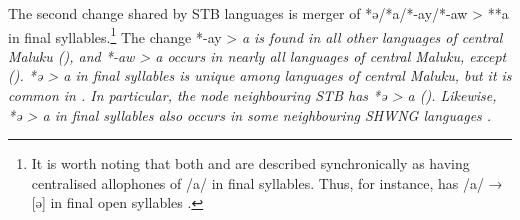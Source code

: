 \largerpage
{}
The second change shared by STB languages is merger of *ə/*a/*-ay/*-aw
> **a in final syllables.\footnote{
		It is worth noting that both
		 and  are described synchronically
		as having centralised allophones of /a/ in final syllables.
		Thus, for instance,  has /a/ → [ə] in final open syllables
		\citep[192]{Marshall2000}.}
The change *-ay > \it{a} is found
in all other languages of central Maluku (),
and *-aw > \it{a} occurs in nearly all languages of central Maluku,
except  ().
*ə > \it{a} in final syllables is unique among languages
of central Maluku, but it is common in .
In particular, the  node neighbouring
STB has *ə > \it{a} ().
Likewise, *ə > \it{a} in final syllables also occurs in some
neighbouring SHWNG languages \citep[79f]{Kamholz2014}.

